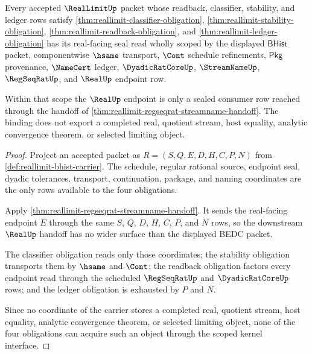 \begin{theorem}
\label{thm:reallimit-scoped-kernel-interface}
Every accepted $\RealLimitUp$ packet whose readback, classifier, stability, and
ledger rows satisfy
\autoref{thm:reallimit-classifier-obligation},
\autoref{thm:reallimit-stability-obligation},
\autoref{thm:reallimit-readback-obligation}, and
\autoref{thm:reallimit-ledger-obligation} has its real-facing seal read wholly
scoped by the displayed $\mathsf{BHist}$ packet, componentwise $\hsame$
transport, $\Cont$ schedule refinements, $\mathsf{Pkg}$ provenance,
$\NameCert$ ledger, $\DyadicRatCoreUp$, $\StreamNameUp$, $\RegSeqRatUp$, and
$\RealUp$ endpoint row.

Within that scope the $\RealUp$ endpoint is only a sealed consumer row reached
through the handoff of
\autoref{thm:reallimit-regseqrat-streamname-handoff}. The binding does not
export a completed real, quotient stream, host equality, analytic convergence
theorem, or selected limiting object.
\end{theorem}
\begin{proof}
Project an accepted packet as $R=(S,Q,E,D,H,C,P,N)$ from
\autoref{def:reallimit-bhist-carrier}. The schedule, regular rational source,
endpoint seal, dyadic tolerances, transport, continuation, package, and naming
coordinates are the only rows available to the four obligations.

Apply \autoref{thm:reallimit-regseqrat-streamname-handoff}. It sends the
real-facing endpoint $E$ through the same $S$, $Q$, $D$, $H$, $C$, $P$, and
$N$ rows, so the downstream $\RealUp$ handoff has no wider surface than the
displayed BEDC packet.

The classifier obligation reads only those coordinates; the stability
obligation transports them by $\hsame$ and $\Cont$; the readback obligation
factors every endpoint read through the scheduled $\RegSeqRatUp$ and
$\DyadicRatCoreUp$ rows; and the ledger obligation is exhausted by $P$ and
$N$.

Since no coordinate of the carrier stores a completed real, quotient stream,
host equality, analytic convergence theorem, or selected limiting object, none
of the four obligations can acquire such an object through the scoped kernel
interface.
\end{proof}

